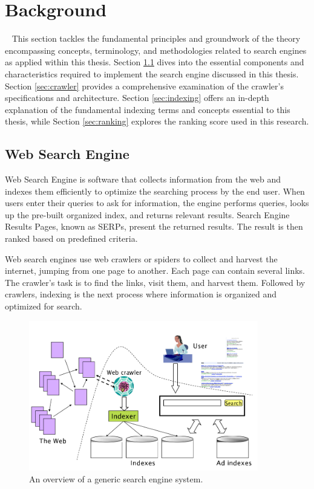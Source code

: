 \chapter{Background}\
\label{chap:background}
This section tackles the fundamental principles and groundwork of the theory encompassing concepts, terminology, and methodologies related to search engines as applied within this thesis. Section \ref{sec:web-search-engine} dives into the essential components and characteristics required to implement the search engine discussed in this thesis. Section \ref{sec:crawler} provides a comprehensive examination of the crawler's specifications and architecture. Section \ref{sec:indexing} offers an in-depth explanation of the fundamental indexing terms and concepts essential to this thesis, while Section \ref{sec:ranking} explores the ranking score used in this research.


\section{Web Search Engine}
\label{sec:web-search-engine}
Web Search Engine is software that collects information from the web and indexes them efficiently to optimize the searching process by the end user. When users enter their queries to ask for information, the engine performs queries, looks up the pre-built organized index, and returns relevant results. Search Engine Results Pages, known as SERPs, present the returned results. The result is then ranked based on predefined criteria. 

Web search engines use web crawlers or spiders to collect and harvest the internet, jumping from one page to another. Each page can contain several links. The crawler's task is to find the links, visit them, and harvest them. Followed by crawlers, indexing is the next process where information is organized and optimized for search.

\begin{figure}[h]	
     \centering
         \includegraphics[width=10cm]{figures/engine_components.png}
              \caption{An overview of a generic search engine system.}
     \label{fig:search-engine-overvoew}
\end{figure}

